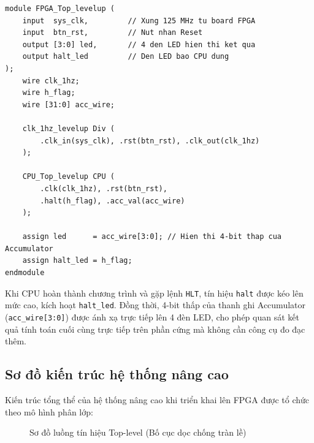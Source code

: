\begin{lstlisting}[caption=Mã nguồn Verilog khối Top-level cho FPGA]
module FPGA_Top_levelup (
    input  sys_clk,         // Xung 125 MHz tu board FPGA
    input  btn_rst,         // Nut nhan Reset
    output [3:0] led,       // 4 den LED hien thi ket qua
    output halt_led         // Den LED bao CPU dung
);
    wire clk_1hz;
    wire h_flag;
    wire [31:0] acc_wire;

    clk_1hz_levelup Div (
        .clk_in(sys_clk), .rst(btn_rst), .clk_out(clk_1hz)
    );

    CPU_Top_levelup CPU (
        .clk(clk_1hz), .rst(btn_rst),
        .halt(h_flag), .acc_val(acc_wire)
    );

    assign led      = acc_wire[3:0]; // Hien thi 4-bit thap cua Accumulator
    assign halt_led = h_flag;
endmodule
\end{lstlisting}

Khi CPU hoàn thành chương trình và gặp lệnh \texttt{HLT}, tín hiệu \texttt{halt} được kéo lên mức cao, kích hoạt \texttt{halt\_led}. Đồng thời, 4-bit thấp của thanh ghi Accumulator (\texttt{acc\_wire[3:0]}) được ánh xạ trực tiếp lên 4 đèn LED, cho phép quan sát kết quả tính toán cuối cùng trực tiếp trên phần cứng mà không cần công cụ đo đạc thêm.

\subsection{Sơ đồ kiến trúc hệ thống nâng cao}
Kiến trúc tổng thể của hệ thống nâng cao khi triển khai lên FPGA được tổ chức theo mô hình phân lớp:

\begin{figure}[H]
\centering
{}
\caption{Sơ đồ luồng tín hiệu Top-level (Bố cục dọc chống tràn lề)}
\label{fig:fpga_top_level}
\end{figure}


